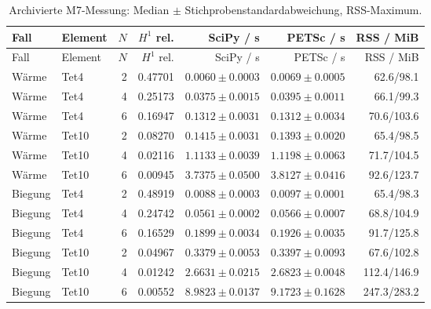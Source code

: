 \begin{longtable}{llrrrrr}
\caption{Archivierte M7-Messung: Median $\pm$ Stichprobenstandardabweichung, RSS-Maximum.}\label{tab:vv-cost}\\
Fall & Element & $N$ & $H^1$ rel. & SciPy / s & PETSc / s & RSS / MiB\\\hline
\endfirsthead
Fall & Element & $N$ & $H^1$ rel. & SciPy / s & PETSc / s & RSS / MiB\\\hline
\endhead
Wärme & Tet4 & 2 & 0.47701 & $0.0060\pm0.0003$ & $0.0069\pm0.0005$ & 62.6/98.1\\
Wärme & Tet4 & 4 & 0.25173 & $0.0375\pm0.0015$ & $0.0395\pm0.0011$ & 66.1/99.3\\
Wärme & Tet4 & 6 & 0.16947 & $0.1312\pm0.0031$ & $0.1312\pm0.0034$ & 70.6/103.6\\
Wärme & Tet10 & 2 & 0.08270 & $0.1415\pm0.0031$ & $0.1393\pm0.0020$ & 65.4/98.5\\
Wärme & Tet10 & 4 & 0.02116 & $1.1133\pm0.0039$ & $1.1198\pm0.0063$ & 71.7/104.5\\
Wärme & Tet10 & 6 & 0.00945 & $3.7375\pm0.0500$ & $3.8127\pm0.0416$ & 92.6/123.7\\
Biegung & Tet4 & 2 & 0.48919 & $0.0088\pm0.0003$ & $0.0097\pm0.0001$ & 65.4/98.3\\
Biegung & Tet4 & 4 & 0.24742 & $0.0561\pm0.0002$ & $0.0566\pm0.0007$ & 68.8/104.9\\
Biegung & Tet4 & 6 & 0.16529 & $0.1899\pm0.0034$ & $0.1926\pm0.0035$ & 91.7/125.8\\
Biegung & Tet10 & 2 & 0.04967 & $0.3379\pm0.0053$ & $0.3397\pm0.0093$ & 67.6/102.8\\
Biegung & Tet10 & 4 & 0.01242 & $2.6631\pm0.0215$ & $2.6823\pm0.0048$ & 112.4/146.9\\
Biegung & Tet10 & 6 & 0.00552 & $8.9823\pm0.0137$ & $9.1723\pm0.1628$ & 247.3/283.2\\
\end{longtable}
